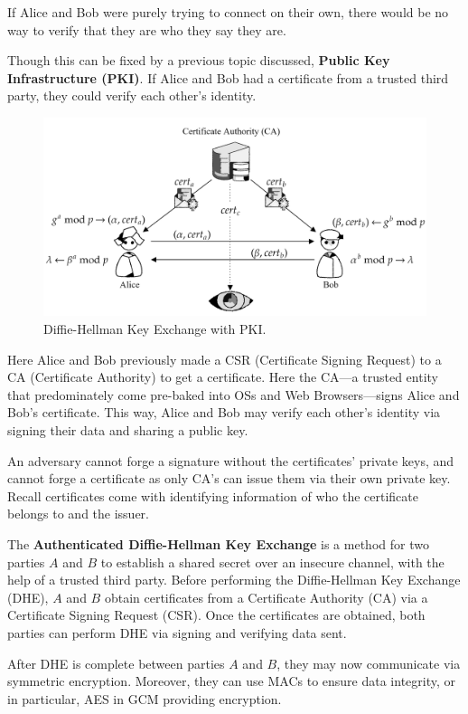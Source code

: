 \noindent
If Alice and Bob were purely trying to connect on their own, there would be no way to verify that they are who they say they are.

\newpage

\noindent
Though this can be fixed by a previous topic discussed, \textbf{Public Key Infrastructure (PKI)}. If 
Alice and Bob had a certificate from a trusted third party, they could verify each other's identity.

\begin{figure}[h!]
    \centering
    \includegraphics[width=.9\textwidth]{Sections/sec/enc/dh/pki.png}
    \caption{Diffie-Hellman Key Exchange with PKI.}
    \label{fig:dh}
\end{figure}

\noindent
Here Alice and Bob previously made a CSR (Certificate Signing Request) to a CA (Certificate Authority) to get a certificate. Here the
CA---a trusted entity that predominately come pre-baked into OSs and Web Browsers---signs Alice and Bob's certificate. This way,
Alice and Bob may verify each other's identity via signing their data and sharing a public key.

An adversary cannot forge a signature without the certificates' private keys, and cannot forge a certificate as only CA's can issue them via their own private key.
Recall certificates come with identifying information of who the certificate belongs to and the issuer.

\begin{theo}

    \label{theo:dh}
    The \textbf{Authenticated Diffie-Hellman Key Exchange} is a method for two parties $A$ and $B$ to establish a shared secret over an insecure channel, with the help of a trusted third party.
    Before performing the Diffie-Hellman Key Exchange (DHE), $A$ and $B$ obtain certificates from a Certificate Authority (CA) via a Certificate Signing Request (CSR).
    Once the certificates are obtained, both parties can perform DHE via signing and verifying data sent. \hfill \cite{goldberg_cs357}
\end{theo}

\begin{theo}

    \label{theo:dh}
    After DHE is complete between parties $A$ and $B$, they may now communicate 
    via symmetric encryption. Moreover, they can use MACs to ensure data integrity, or in particular, AES in GCM providing encryption.
\end{theo}